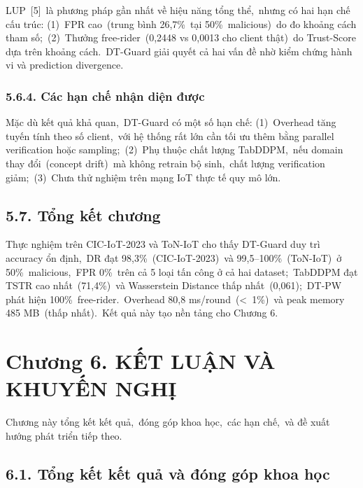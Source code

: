 LUP~{[}5{]}~là phương pháp gần nhất về hiệu năng tổng thể,~nhưng có hai hạn chế cấu trúc: (1)~FPR cao~(trung bình 26,7\%~tại 50\%~malicious)~do đo khoảng cách tham số;~(2)~Thưởng free-rider~(0,2448 vs 0,0013 cho client thật)~do Trust-Score dựa trên khoảng cách.~DT-Guard giải quyết cả hai vấn đề nhờ kiểm chứng hành vi và prediction divergence.

\subsubsection{5.6.4. Các hạn chế nhận diện được}\label{cuxe1c-hux1ea1n-chux1ebf-nhux1eadn-diux1ec7n-ux111ux1b0ux1ee3c}

Mặc dù kết quả khả quan,~DT-Guard có một số hạn chế: (1)~Overhead tăng tuyến tính theo số client,~với hệ thống rất lớn cần tối ưu thêm bằng parallel verification hoặc sampling;~(2)~Phụ thuộc chất lượng TabDDPM,~nếu domain thay đổi~(concept drift)~mà không retrain bộ sinh,~chất lượng verification giảm;~(3)~Chưa thử nghiệm trên mạng IoT thực tế quy mô lớn.

\subsection{5.7. Tổng kết chương}\label{tux1ed5ng-kux1ebft-chux1b0ux1a1ng-3}

Thực nghiệm trên CIC-IoT-2023 và ToN-IoT cho thấy DT-Guard duy trì accuracy ổn định,~DR đạt 98,3\%~(CIC-IoT-2023)~và 99,5--100\%~(ToN-IoT)~ở 50\%~malicious,~FPR 0\%~trên cả 5 loại tấn công ở cả hai dataset;~TabDDPM đạt TSTR cao nhất~(71,4\%)~và Wasserstein Distance thấp nhất~(0,061);~DT-PW phát hiện 100\%~free-rider.~Overhead 80,8 ms/round~(\textless~1\%)~và peak memory 485 MB~(thấp nhất).~Kết quả này tạo nền tảng cho Chương 6.

\section{Chương 6. KẾT LUẬN VÀ KHUYẾN NGHỊ}\label{chux1b0ux1a1ng-6.-kux1ebft-luux1eadn-vuxe0-khuyux1ebfn-nghux1ecb}

Chương này tổng kết kết quả,~đóng góp khoa học,~các hạn chế,~và đề xuất hướng phát triển tiếp theo.

\subsection{6.1. Tổng kết kết quả và đóng góp khoa học}\label{tux1ed5ng-kux1ebft-kux1ebft-quux1ea3-vuxe0-ux111uxf3ng-guxf3p-khoa-hux1ecdc}

